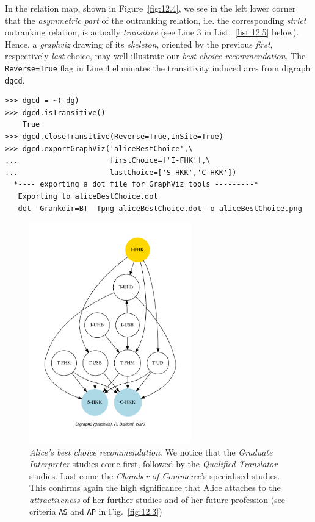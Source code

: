 In the relation map, shown in Figure~\vref{fig:12.4}, we see in the left lower corner that the \emph{asymmetric part} of the outranking relation, i.e. the corresponding \emph{strict} outranking relation, is actually \emph{transitive} (see Line 3 in List.~\vref{list:12.5} below). Hence, a \emph{graphviz} drawing of its \emph{skeleton}, oriented by the previous \emph{first}, respectively \emph{last} choice, may well illustrate our \emph{best choice recommendation}. The \texttt{Reverse=True} flag in Line 4 eliminates the transitivity induced arcs from digraph \texttt{dgcd}.
\begin{lstlisting}[caption={Alice's strict best choice recommendation},label=list:12.5]
>>> dgcd = ~(-dg)
>>> dgcd.isTransitive()
    True
>>> dgcd.closeTransitive(Reverse=True,InSite=True)
>>> dgcd.exportGraphViz('aliceBestChoice',\
...                     firstChoice=['I-FHK'],\
...                     lastChoice=['S-HKK','C-HKK'])
  *---- exporting a dot file for GraphViz tools ---------*
   Exporting to aliceBestChoice.dot
   dot -Grankdir=BT -Tpng aliceBestChoice.dot -o aliceBestChoice.png
\end{lstlisting}
\begin{figure}[ht]
\sidecaption[t]
\includegraphics[width=7cm]{Figures/12-5-aliceBestChoice.pdf}
\caption[Alice's best choice recommendation]{\emph{Alice's best choice recommendation}. We notice that the \emph{Graduate Interpreter} studies come first, followed by the \emph{Qualified Translator} studies. Last come the \emph{Chamber of Commerce}'s specialised studies. This confirms again the high significance that Alice attaches to the \emph{attractiveness} of her further studies and of her future profession (see criteria \texttt{AS} and \texttt{AP} in Fig.~\vref{fig:12.3})}
\label{fig:12.5}       %
\end{figure}

